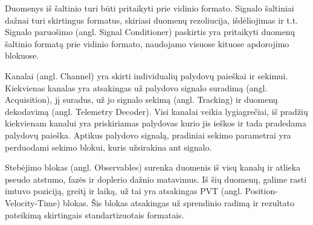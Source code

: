 \documentclass[main.tex]{subfiles}
\begin{document}
Duomenys iš šaltinio turi būti pritaikyti prie vidinio formato. Signalo šaltiniai
dažnai turi skirtingus formatus, skiriasi duomenų rezoliucija, išdėliojimas ir t.t.
Signalo paruošimo (angl. Signal Conditioner) paskirtis yra pritaikyti duomenų šaltinio
formatą prie vidinio formato, naudojamo visuose kituose apdorojimo blokuose.

Kanalai (angl. Channel) yra skirti individualių palydovų paieškai ir sekimui.
Kiekvienas kanalas yra atsakingas už palydovo signalo suradimą (angl. Acquisition),
jį suradus, už jo signalo sekimą (angl. Tracking) ir duomenų dekodavimą (angl. Telemetry
Decoder). Visi kanalai veikia lygiagrečiai, iš pradžių kiekvienam kanalui yra
priskiriamas palydovas kurio jis ieškos ir tada pradedama palydovų paieška.
Aptikus palydovo signalą, pradiniai sekimo parametrai yra perduodami sekimo
blokui, kuris užsirakina ant signalo.

Stebėjimo blokas (angl. Observables) surenka duomenis iš visų kanalų ir atlieka
pseudo atstumo, fazės ir doplerio dažnio matavimus. Iš šių duomenų, galime
rasti imtuvo poziciją, greitį ir laiką, už tai yra atsakingas PVT
(angl. Position-Velocity-Time) blokas. Šis blokas atsakingas už sprendinio
radimą ir rezultato pateikimą skirtingais standartizuotais formatais.
\end{document}
